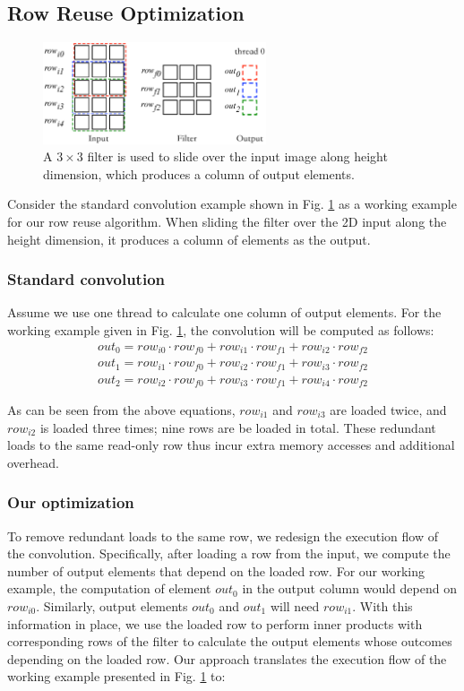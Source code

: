 \subsection{Row Reuse Optimization}
\label{sec:rowreuse}
\begin{figure}[t!]
	\centering
	\includegraphics[width=0.8\columnwidth,height=3cm]{./figure/rowreuse.eps}
\caption{A $3 \times 3$ filter is used to slide over the input image along height dimension, which produces a column of output elements.}
\label{fig:rowreuse}
\end{figure}

 Consider the standard convolution example shown in Fig. \ref{fig:rowreuse} as a working example for our row
reuse algorithm. When sliding the filter over the 2D input along the height dimension, it produces a column of elements as the output.

\subsubsection{Standard convolution} Assume we use one thread to calculate one column of output elements.
For the working example given in Fig. \ref{fig:rowreuse}, the convolution will be computed as follows:
\begin{gather*}
  out_0=row_{i0} \cdot row_{f0} + row_{i1} \cdot row_{f1} + row_{i2} \cdot row_{f2} \\
out_{1}=row_{i1} \cdot row_{f0} + row_{i2} \cdot row_{f1} + row_{i3} \cdot row_{f2} \\
out_{2}=row_{i2} \cdot row_{f0} + row_{i3} \cdot row_{f1} + row_{i4} \cdot row_{f2}
\end{gather*}

As can be seen from the above equations, $row_{i1}$ and $row_{i3}$ are loaded twice, and $row_{i2}$ is loaded three times; nine rows are be
loaded in total. These redundant loads to the same read-only row thus incur extra memory accesses and additional overhead.

\subsubsection{Our optimization}
To remove redundant loads to the same row, we redesign the execution flow of the convolution.
Specifically, after loading a row from the input, we compute the number of output elements that depend on the loaded row.
For our working example, the computation of element $out_0$ in the output column would depend on $row_{i0}$.
Similarly, output elements $out_0$ and $out_1$ will need $row_{i1}$. With this information in place, we use the loaded row to perform inner products with corresponding rows of the filter to calculate the output elements whose outcomes depending on the loaded row.
Our approach translates the execution flow of the working example presented in Fig. \ref {fig:rowreuse} to:

